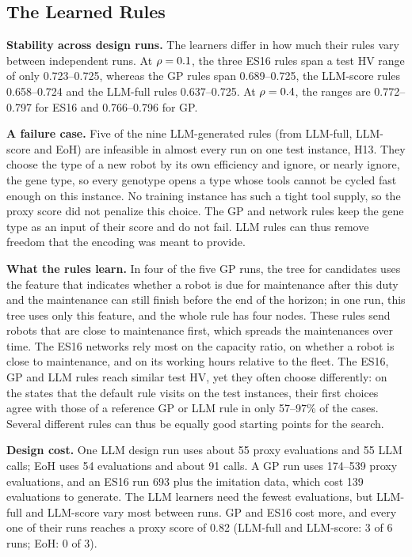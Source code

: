 \documentclass[journal]{IEEEtran}
\begin{document}
\subsection{The Learned Rules}
\textbf{Stability across design runs.}
The learners differ in how much their rules vary between independent runs.
At $\rho = 0.1$, the three ES16 rules span a test HV range of only 0.723--0.725,
whereas the GP rules span 0.689--0.725, the LLM-score rules 0.658--0.724 and the LLM-full rules 0.637--0.725.
At $\rho = 0.4$, the ranges are 0.772--0.797 for ES16 and 0.766--0.796 for GP.

\textbf{A failure case.}
Five of the nine LLM-generated rules (from LLM-full, LLM-score and EoH) are infeasible in almost every run on one test instance, H13.
They choose the type of a new robot by its own efficiency and ignore, or nearly ignore, the gene type,
so every genotype opens a type whose tools cannot be cycled fast enough on this instance.
No training instance has such a tight tool supply, so the proxy score did not penalize this choice.
The GP and network rules keep the gene type as an input of their score and do not fail.
LLM rules can thus remove freedom that the encoding was meant to provide.

\textbf{What the rules learn.}
In four of the five GP runs, the tree for \reuse candidates uses the feature that indicates whether a robot is due for maintenance after this duty and the maintenance can still finish before the end of the horizon;
in one run, this tree uses only this feature, and the whole rule has four nodes.
These rules send robots that are close to maintenance first, which spreads the maintenances over time.
The ES16 networks rely most on the capacity ratio, on whether a robot is close to maintenance, and on its working hours relative to the fleet.
The ES16, GP and LLM rules reach similar test HV, yet they often choose differently:
on the states that the default rule visits on the test instances, their first choices agree with those of a reference GP or LLM rule in only 57--97\% of the cases.
Several different rules can thus be equally good starting points for the search.

\textbf{Design cost.}
One LLM design run uses about 55 proxy evaluations and 55 LLM calls; EoH uses 54 evaluations and about 91 calls.
A GP run uses 174--539 proxy evaluations, and an ES16 run 693 plus the imitation data, which cost 139 evaluations to generate.
The LLM learners need the fewest evaluations, but LLM-full and LLM-score vary most between runs.
GP and ES16 cost more, and every one of their runs reaches a proxy score of 0.82 (LLM-full and LLM-score: 3 of 6 runs; EoH: 0 of 3).
\end{document}
